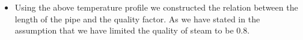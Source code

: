 \documentclass[compileTAMUreport.tex]{subfiles}
\begin{document}
\begin{itemize}
\item Using the above temperature profile we constructed the relation between the length of the pipe and the quality factor. As we have stated in the assumption that we have limited the quality of steam to be 0.8.
\end{itemize}
\end{document}
